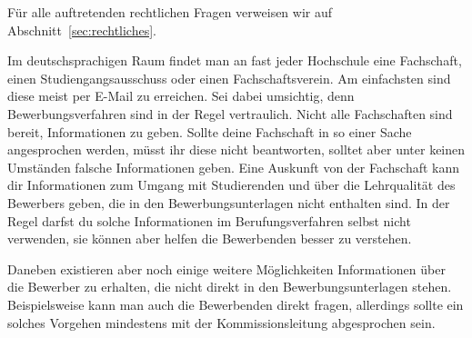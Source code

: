 Für alle auftretenden rechtlichen Fragen verweisen wir auf Abschnitt~\ref{sec:rechtliches}.

Im deutschsprachigen Raum findet man an fast jeder Hochschule eine Fachschaft, einen Studiengangsausschuss oder einen Fachschaftsverein. 
Am einfachsten sind diese meist per E-Mail zu erreichen. 
Sei dabei umsichtig, denn Bewerbungsverfahren sind in der Regel vertraulich.
Nicht alle Fachschaften sind bereit, Informationen zu geben.
Sollte deine Fachschaft in so einer Sache angesprochen werden, müsst ihr diese nicht beantworten, solltet aber unter keinen Umständen falsche Informationen geben.
Eine Auskunft von der Fachschaft kann dir Informationen zum Umgang mit Studierenden und über die Lehrqualität des Bewerbers geben, die in den Bewerbungsunterlagen nicht enthalten sind.
In der Regel darfst du solche Informationen im Berufungsverfahren selbst nicht verwenden, sie können aber helfen die Bewerbenden besser zu verstehen.

Daneben existieren aber noch einige weitere Möglichkeiten Informationen über die Bewerber zu erhalten, die nicht direkt in den Bewerbungsunterlagen stehen.
Beispielsweise kann man auch die Bewerbenden direkt fragen, allerdings sollte ein solches Vorgehen mindestens mit der Kommissionsleitung abgesprochen sein.


